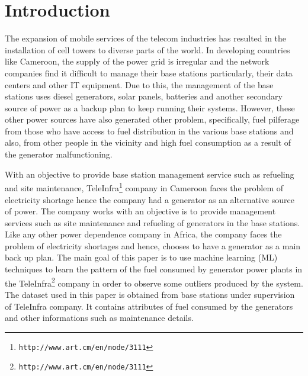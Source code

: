 \documentclass[final,5p,times,twocolumn,authoryear]{elsarticle}
\begin{document}
\section{Introduction} \label{sec:intro}

The expansion of mobile services of the telecom industries has resulted in the installation of cell towers to diverse parts of the world. In developing countries like Cameroon, the supply of the power grid is irregular and the network companies find it difficult to manage their base stations particularly, their data centers and other IT equipment. Due to this, the management of the base stations uses diesel generators, solar panels, batteries and another secondary source of power as a backup plan to keep running their systems. However, these other power sources have also generated other problem, specifically, fuel pilferage from those who have access to fuel distribution in the various base stations and also, from other people in the vicinity and high fuel consumption as a result of the generator malfunctioning.

With an objective to provide base station management service such as refueling and site maintenance, TeleInfra\footnote{{\tt http://www.art.cm/en/node/3111}} company in Cameroon faces the problem of electricity shortage hence the company had a generator as an alternative source of power. The company works with an objective is to provide management services such as site maintenance and refueling of generators in the base stations. Like any other power dependence company in Africa, 
the company faces the problem of electricity shortages and hence, chooses to have a generator as a main back up plan. The main goal of this paper is to use machine learning (ML) techniques to learn the pattern of the fuel consumed by generator power plants in the 
TeleInfra\footnote{{\tt http://www.art.cm/en/node/3111}} company in order to observe some outliers produced by the system. The dataset used in this paper is obtained from  base stations  under supervision of TeleInfra company. It contains attributes of fuel consumed by the generators and other informations such as maintenance details.
\end{document}
